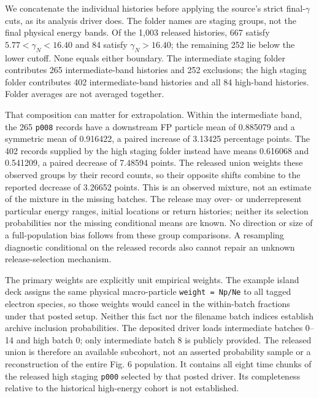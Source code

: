 We concatenate the individual histories before applying the source's
strict final-\(\gamma\) cuts, as its analysis driver does. The folder
names are staging groups, not the final physical energy bands. Of the
1,003 released histories, 667 satisfy \(5.77<\gamma_N<16.40\) and 84
satisfy \(\gamma_N>16.40\); the remaining 252 lie below the lower
cutoff. None equals either boundary. The intermediate staging folder
contributes 265 intermediate-band histories and 252 exclusions; the high
staging folder contributes 402 intermediate-band histories and all 84
high-band histories. Folder averages are not averaged together.

That composition can matter for extrapolation. Within the intermediate
band, the 265 \nolinkurl{p008} records have a downstream FP particle mean
of 0.885079 and a symmetric mean of 0.916422, a paired increase of
3.13425 percentage points. The 402 records supplied by the high staging
folder instead have means 0.616068 and 0.541209, a paired decrease of
7.48594 points. The released union weights these observed groups by
their record counts, so their opposite shifts combine to the reported
decrease of 3.26652 points. This is an observed mixture, not an estimate
of the mixture in the missing batches. The release may over- or
underrepresent particular energy ranges, initial locations or return
histories; neither its selection probabilities nor the missing
conditional means are known. No direction or size of a full-population
bias follows from these group comparisons. A resampling diagnostic
conditional on the released records also cannot repair an unknown
release-selection mechanism.

The primary weights are explicitly unit empirical weights. The example
island deck assigns the same physical macro-particle
\texttt{weight\ =\ Np/Ne} to all tagged electron species, so those
weights would cancel in the within-batch fractions under that posted
setup. Neither this fact nor the filename batch indices establish
archive inclusion probabilities. The deposited driver loads intermediate
batches 0--14 and high batch 0; only intermediate batch 8 is publicly
provided. The released union is therefore an available subcohort, not an
asserted probability sample or a reconstruction of the entire Fig. 6
population. It contains all eight time chunks of the released high
staging \nolinkurl{p000} selected by that posted driver. Its completeness
relative to the historical high-energy cohort is not established.

